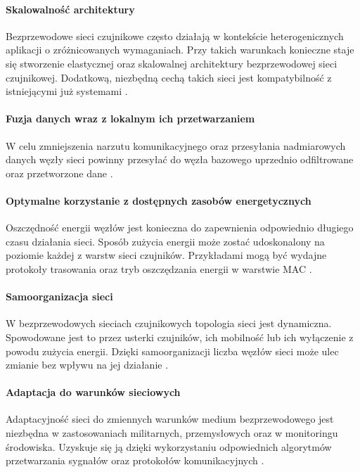 \paragraph{Skalowalność architektury}
Bezprzewodowe sieci czujnikowe często działają w kontekście heterogenicznych aplikacji o zróżnicowanych wymaganiach. Przy takich warunkach konieczne staje się stworzenie elastycznej oraz skalowalnej architektury bezprzewodowej sieci czujnikowej. Dodatkową, niezbędną cechą takich sieci jest kompatybilność z istniejącymi już systemami \cite{Pakzad2008}.

\paragraph{Fuzja danych wraz z lokalnym ich przetwarzaniem}
W celu zmniejszenia narzutu komunikacyjnego oraz przesyłania nadmiarowych danych węzły sieci powinny przesyłać do węzła bazowego uprzednio odfiltrowane oraz przetworzone dane \cite{Wu2017, Abdelgawad2012}.

\paragraph{Optymalne korzystanie z dostępnych zasobów energetycznych}
Oszczędność energii węzłów jest konieczna do zapewnienia odpowiednio długiego czasu działania sieci. Sposób zużycia energii może zostać udoskonalony na poziomie każdej z warstw sieci czujników. Przykładami mogą być wydajne protokoły trasowania \cite{Pereira2016} oraz tryb oszczędzania energii w warstwie MAC \cite{Michael2006}.

\paragraph{Samoorganizacja sieci}
W bezprzewodowych sieciach czujnikowych topologia sieci jest dynamiczna. Spowodowane jest to przez usterki czujników, ich mobilność lub ich wyłączenie z powodu zużycia energii. Dzięki samoorganizacji liczba węzłów sieci może ulec zmianie bez wpływu na jej działanie \cite{Gungor2009}.

\paragraph{Adaptacja do warunków sieciowych}
Adaptacyjność sieci do zmiennych warunków medium bezprzewodowego jest niezbędna w zastosowaniach militarnych, przemysłowych oraz w monitoringu środowiska. Uzyskuje się ją dzięki wykorzystaniu odpowiednich algorytmów przetwarzania sygnałów oraz protokołów komunikacyjnych \cite{Gungor2009}.

